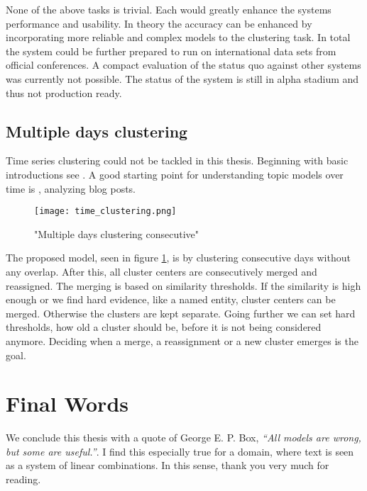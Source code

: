 None of the above tasks is trivial. Each would greatly enhance the systems performance and usability. In theory the accuracy can be enhanced by incorporating more reliable and complex models to the clustering task. In total the system could be further prepared to run on international data sets from official conferences. A compact evaluation of the status quo against other systems was currently not possible. The status of the system is still in alpha stadium and thus not production ready.

\subsection*{Multiple days clustering}
  Time series clustering could not be tackled in this thesis. Beginning with basic introductions see \cite{ClusteringTimesSeriesSurves2005, RecentTechniquesClusteringSurvey2012, IncrementalClustering2012}. A good starting point for understanding topic models over time is \cite{BlogTopicLDA2013}, analyzing blog posts.

    \begin{figure}[h!]
      \centering
        \texttt{[image: time\_clustering.png]}
        \caption{"Multiple days clustering consecutive"}
        \label{time_clustering}
    \end{figure}

  The proposed model, seen in figure \ref{time_clustering}, is by clustering consecutive days without any overlap. After this, all cluster centers are consecutively merged and reassigned. The merging is based on similarity thresholds. If the similarity is high enough or we find hard evidence, like a named entity, cluster centers can be merged. Otherwise the clusters are kept separate. Going further we can set hard thresholds, how old a cluster should be, before it is not being considered anymore. Deciding when a merge, a reassignment or a new cluster emerges is the goal.

\section{Final Words}
We conclude this thesis with a quote of George E. P. Box, \emph{``All models are wrong, but some are useful.''}. I find this especially true for a domain, where text is seen as a system of linear combinations. In this sense, thank you very much for reading.

